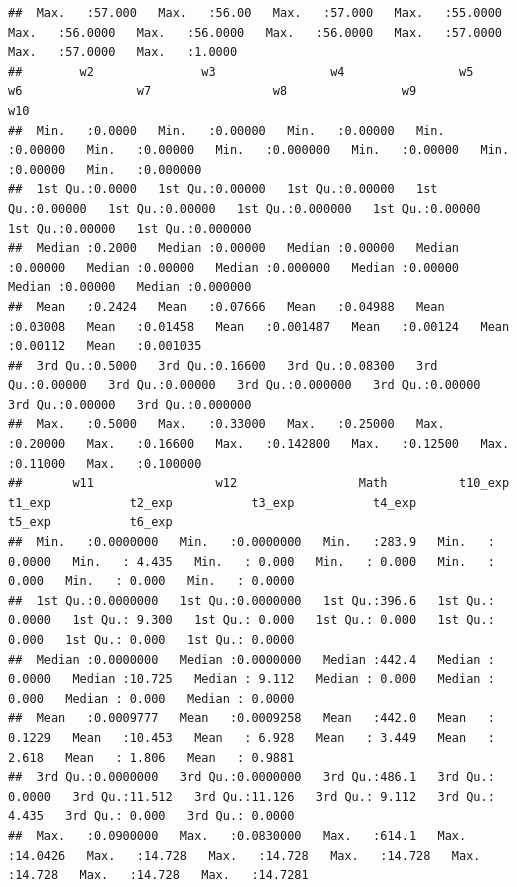 \documentclass[
]{book}
\begin{document}
\begin{verbatim}
##  Max.   :57.000   Max.   :56.00   Max.   :57.000   Max.   :55.0000   Max.   :56.0000   Max.   :56.0000   Max.   :56.0000   Max.   :57.0000   Max.   :57.0000   Max.   :1.0000  
##        w2               w3                w4                w5                w6                w7                 w8                w9               w10          
##  Min.   :0.0000   Min.   :0.00000   Min.   :0.00000   Min.   :0.00000   Min.   :0.00000   Min.   :0.000000   Min.   :0.00000   Min.   :0.00000   Min.   :0.000000  
##  1st Qu.:0.0000   1st Qu.:0.00000   1st Qu.:0.00000   1st Qu.:0.00000   1st Qu.:0.00000   1st Qu.:0.000000   1st Qu.:0.00000   1st Qu.:0.00000   1st Qu.:0.000000  
##  Median :0.2000   Median :0.00000   Median :0.00000   Median :0.00000   Median :0.00000   Median :0.000000   Median :0.00000   Median :0.00000   Median :0.000000  
##  Mean   :0.2424   Mean   :0.07666   Mean   :0.04988   Mean   :0.03008   Mean   :0.01458   Mean   :0.001487   Mean   :0.00124   Mean   :0.00112   Mean   :0.001035  
##  3rd Qu.:0.5000   3rd Qu.:0.16600   3rd Qu.:0.08300   3rd Qu.:0.00000   3rd Qu.:0.00000   3rd Qu.:0.000000   3rd Qu.:0.00000   3rd Qu.:0.00000   3rd Qu.:0.000000  
##  Max.   :0.5000   Max.   :0.33000   Max.   :0.25000   Max.   :0.20000   Max.   :0.16600   Max.   :0.142800   Max.   :0.12500   Max.   :0.11000   Max.   :0.100000  
##       w11                 w12                 Math          t10_exp            t1_exp           t2_exp           t3_exp           t4_exp           t5_exp           t6_exp       
##  Min.   :0.0000000   Min.   :0.0000000   Min.   :283.9   Min.   : 0.0000   Min.   : 4.435   Min.   : 0.000   Min.   : 0.000   Min.   : 0.000   Min.   : 0.000   Min.   : 0.0000  
##  1st Qu.:0.0000000   1st Qu.:0.0000000   1st Qu.:396.6   1st Qu.: 0.0000   1st Qu.: 9.300   1st Qu.: 0.000   1st Qu.: 0.000   1st Qu.: 0.000   1st Qu.: 0.000   1st Qu.: 0.0000  
##  Median :0.0000000   Median :0.0000000   Median :442.4   Median : 0.0000   Median :10.725   Median : 9.112   Median : 0.000   Median : 0.000   Median : 0.000   Median : 0.0000  
##  Mean   :0.0009777   Mean   :0.0009258   Mean   :442.0   Mean   : 0.1229   Mean   :10.453   Mean   : 6.928   Mean   : 3.449   Mean   : 2.618   Mean   : 1.806   Mean   : 0.9881  
##  3rd Qu.:0.0000000   3rd Qu.:0.0000000   3rd Qu.:486.1   3rd Qu.: 0.0000   3rd Qu.:11.512   3rd Qu.:11.126   3rd Qu.: 9.112   3rd Qu.: 4.435   3rd Qu.: 0.000   3rd Qu.: 0.0000  
##  Max.   :0.0900000   Max.   :0.0830000   Max.   :614.1   Max.   :14.0426   Max.   :14.728   Max.   :14.728   Max.   :14.728   Max.   :14.728   Max.   :14.728   Max.   :14.7281  

\end{verbatim}
\end{document}
